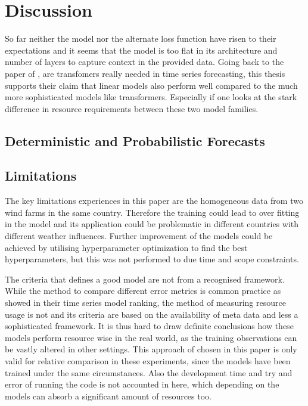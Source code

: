 \documentclass{article}
\begin{document}
\section{Discussion}

So far neither the model nor the alternate loss function have risen to their expectations and it seems that the model is too flat in its architecture and number of layers to capture context in the provided data. Going back to the paper of \cite{transformers-effectiveness}, are transfomers really needed in time series forecasting, this thesis supports their claim that linear models also perform well compared to the much more sophisticated models like transformers. Especially if one looks at the stark difference in resource requirements between these two model families.

\subsection{Deterministic and Probabilistic Forecasts}

\subsection{Limitations}

The key limitations experiences in this paper are the homogeneous data from two wind farms in the same country. Therefore the training could lead to over fitting in the model and its application could be problematic in different countries with different weather influences. Further improvement of the models could be achieved by utilising hyperparameter optimization to find the best hyperparameters, but this was not performed to due time and scope constraints. 

The criteria that defines a good model are not from a recognised framework. While the method to compare different error metrics is common practice as \cite{TS-ranking} showed in their time series model ranking, the method of measuring resource usage is not and its criteria are based on the availability of meta data and less a sophisticated framework. It is thus hard to draw definite conclusions how these models perform resource wise in the real world, as the training observations can be vastly altered in other settings. This approach of chosen in this paper is only valid for relative comparison in these experiments, since the models have been trained under the same circumstances. Also the development time and try and error of running the code is not accounted in here, which depending on the models can absorb a significant amount of resources too. 
\end{document}
